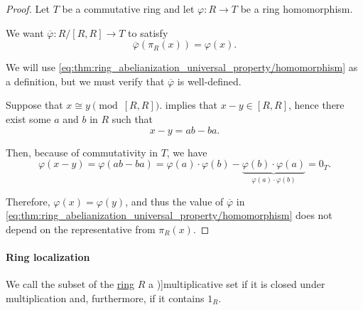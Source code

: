\begin{proof}
  Let \( T \) be a commutative ring and let \( \varphi: R \to T \) be a ring homomorphism.

  We want \( \overline{\varphi}: R / [R, R] \to T \) to satisfy
  \begin{equation}\label{eq:thm:ring_abelianization_universal_property/homomorphism}
    \overline{\varphi}(\pi_R(x)) = \varphi(x).
  \end{equation}

  We will use \eqref{eq:thm:ring_abelianization_universal_property/homomorphism} as a definition, but we must verify that \( \overline{\varphi} \) is well-defined.

  Suppose that \( x \cong y \pmod {[R, R]} \).  implies that \( x - y \in [R, R] \), hence there exist some \( a \) and \( b \) in \( R \) such that
  \begin{equation*}
    x - y = ab - ba.
  \end{equation*}

  Then, because of commutativity in \( T \), we have
  \begin{equation*}
    \varphi(x - y)
    =
    \varphi(ab - ba)
    =
    \varphi(a) \cdot \varphi(b) - \underbrace{\varphi(b) \cdot \varphi(a)}_{\varphi(a) \cdot \varphi(b)}
    =
    0_T.
  \end{equation*}

  Therefore, \( \varphi(x) = \varphi(y) \), and thus the value of \( \overline{\varphi} \) in \eqref{eq:thm:ring_abelianization_universal_property/homomorphism} does not depend on the representative from \( \pi_R(x) \).
\end{proof}

\paragraph{Ring localization}

\begin{definition}\label{def:multiplicative_set_in_ring}
  We call the subset of the \hyperref[def:ring]{ring} \( R \) a \term[bg=мултипликативно затворено множество (\cite[23]{КоцевСидеров2016})]{multiplicative set} if it is closed under multiplication and, furthermore, if it contains \( 1_R \).
\end{definition}

